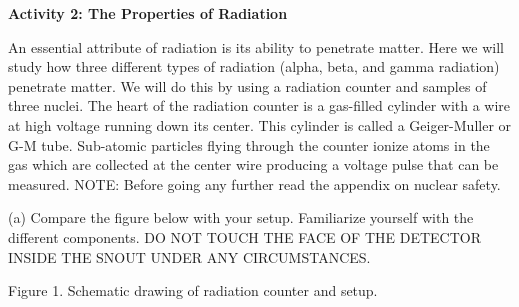 
\textbf{Activity 2: The Properties of Radiation}

An essential attribute of radiation is its ability to penetrate
matter.
Here we will study how three different types of radiation (alpha, beta,
and gamma radiation) penetrate matter. We will do this by using a radiation counter
 and samples of three nuclei.
The heart of the radiation counter is a gas-filled cylinder with a wire at
high voltage running down its center.
This cylinder is called a Geiger-Muller or G-M tube.
Sub-atomic particles flying through the counter ionize atoms in the gas which are 
collected at the center wire producing a voltage pulse that can be measured.
NOTE: Before going any further read the appendix on nuclear safety.

(a) Compare the figure below with your setup. Familiarize yourself with the
different components. DO NOT TOUCH THE FACE OF THE DETECTOR INSIDE
THE SNOUT UNDER ANY CIRCUMSTANCES.

\vspace{0.3cm}
{\centering {} \par}
{\centering Figure 1. Schematic drawing of radiation counter and setup. \par}
\vspace{0.3cm}

